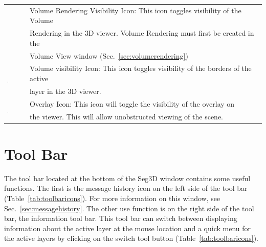\documentclass[fleqn,11pt,openany]{book}
\begin{document}
\begin{table}[h!]
\begin{tabular}{|l|l|}
& Volume Rendering Visibility Icon: This icon toggles visibility of the Volume\\
& Rendering in the 3D viewer.  Volume Rendering must first be created in the\\
& Volume View window (Sec.~\ref{sec:volumerendering})\\
\hline
\multirow{2}{*}{ \includegraphics[width=0.05\textwidth]{Seg3DBasicFunctionality_figures/VolumeVisibleOff.png} }
& Volume visibility Icon: This icon toggles visibility of the borders of the active\\ 
& layer in the 3D viewer.\\
\hline
\multirow{2}{*}{ \includegraphics[width=0.05\textwidth]{Seg3DBasicFunctionality_figures/OverlayOff.png} }
&  Overlay Icon: This icon will toggle the visibility of the overlay on \\
& the viewer.  This will allow unobstructed viewing of the scene.\\
\hline
\end{tabular}
\end{table}


\clearpage
\section{Tool Bar}

The tool bar located at the bottom of the Seg3D window contains some useful functions.  The first is the message history icon on the left side of the tool bar (Table~\ref{tab:toolbaricons}).   For more information on this window, see Sec.~\ref{sec:messagehistory}.  The other use function is on the right side of the tool bar, the information tool bar.  This tool bar can switch between displaying information about the active layer at the mouse location and a quick menu for the active layers by clicking on the switch tool button (Table~\ref{tab:toolbaricons}).  
\end{document}
